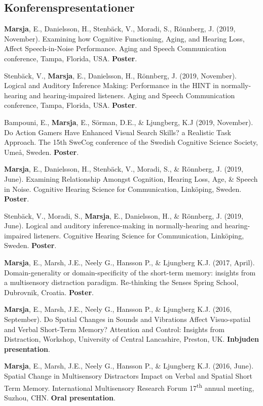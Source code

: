 \documentclass[]{article}
\begin{document}
\hypertarget{konferenspresentationer}{%
\subsection{Konferenspresentationer}\label{konferenspresentationer}}

\textbf{Marsja}, E., Danielsson, H., Stenbäck, V., Moradi, S., Rönnberg,
J. (2019, November). Examining how Cognitive Functioning, Aging, and
Hearing Loss, Affect Speech-in-Noise Performance. Aging and Speech
Communication conference, Tampa, Florida, USA. \textbf{Poster}.

Stenbäck, V., \textbf{Marsja}, E., Danielsson, H., Rönnberg, J. (2019,
November). Logical and Auditory Inference Making: Performance in the
HINT in normally-hearing and hearing-impaired listeners. Aging and
Speech Communication conference, Tampa, Florida, USA. \textbf{Poster}.

Bampouni, E., \textbf{Marsja}, E., Sörman, D.E., \& Ljungberg, K.J
(2019, November). Do Action Gamers Have Enhanced Visual Search Skills? a
Realistic Task Approach. The 15th SweCog conference of the Swedish
Cognitive Science Society, Umeå, Sweden. \textbf{Poster}.

\textbf{Marsja}, E., Danielsson, H., Stenbäck, V., Moradi, S., \&
Rönnberg, J. (2019, June). Examining Relationship Amongst Cognition,
Hearing Loss, Age, \& Speech in Noise. Cognitive Hearing Science for
Communication, Linköping, Sweden. \textbf{Poster}.

Stenbäck, V., Moradi, S., \textbf{Marsja}, E., Danielsson, H., \&
Rönnberg, J. (2019, June). Logical and auditory inference-making in
normally-hearing and hearing-impaired listeners. Cognitive Hearing
Science for Communication, Linköping, Sweden. \textbf{Poster}.

\textbf{Marsja}, E., Marsh, J.E., Neely G., Hansson P., \& Ljungberg
K.J. (2017, April). Domain-generality or domain-specificity of the
short-term memory: insights from a multisensory distraction paradigm.
Re-thinking the Senses Spring School, Dubrovnik, Croatia.
\textbf{Poster}.

\textbf{Marsja}, E., Marsh, J.E., Neely G., Hansson P., \& Ljungberg
K.J. (2016, September). Do Spatial Changes in Sounds and Vibrations
Affect Visuo-spatial and Verbal Short-Term Memory? Attention and
Control: Insights from Distraction, Workshop, University of Central
Lancashire, Preston, UK. \textbf{Inbjuden presentation}.

\textbf{Marsja}, E., Marsh, J.E., Neely G., Hansson P., \& Ljungberg
K.J. (2016, June). Spatial Change in Multisensory Distractors Impact on
Verbal and Spatial Short Term Memory. International Multisensory
Research Forum 17\textsuperscript{th} annual meeting, Suzhou, CHN.
\textbf{Oral presentation}.
\end{document}
